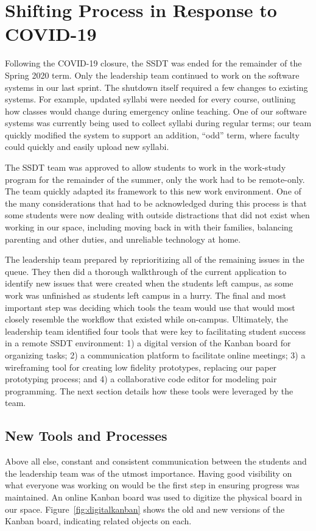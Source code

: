 \section{Shifting Process in Response to COVID-19}

Following the COVID-19 closure, the SSDT was ended for the remainder of the Spring 2020 term. Only the leadership team continued to work on the software systems in our last sprint. The shutdown itself required a few changes to existing systems. For example, updated syllabi were needed for every course, outlining how classes would change during emergency online teaching. One of our software systems was currently being used to collect syllabi during regular terms; our team quickly modified the system to support an addition, ``odd'' term, where faculty could quickly and easily upload new syllabi.

The SSDT team was approved to allow students to work in the work-study program for the remainder of the summer, only the work had to be remote-only. The team quickly adapted its framework to this new work environment. One of the many considerations that had to be acknowledged during this process is that some students were now dealing with outside distractions that did not exist when working in our space, including moving back in with their families, balancing parenting and other duties, and unreliable technology at home.

The leadership team prepared by reprioritizing all of the remaining issues in the queue. They then did a thorough walkthrough of the current application to identify new issues that were created when the students left campus, as some work was unfinished as students left campus in a hurry. The final and most important step was deciding which tools the team would use that would most closely resemble the workflow that existed while on-campus. Ultimately, the leadership team identified four tools that were key to facilitating student success in a remote SSDT environment: 1) a digital version of the Kanban board for organizing tasks; 2) a communication platform to facilitate online meetings; 3) a wireframing tool for creating low fidelity prototypes, replacing our paper prototyping process; and 4) a collaborative code editor for modeling pair programming. The next section details how these tools were leveraged by the team.

\subsection{New Tools and Processes}
Above all else, constant and consistent communication between the students and the leadership team was of the utmost importance. Having good visibility on what everyone was working on would be the first step in ensuring progress was maintained. An online Kanban board was used to digitize the physical board in our space. Figure~\ref{fig:digitalkanban} shows the old and new versions of the Kanban board, indicating related objects on each.

